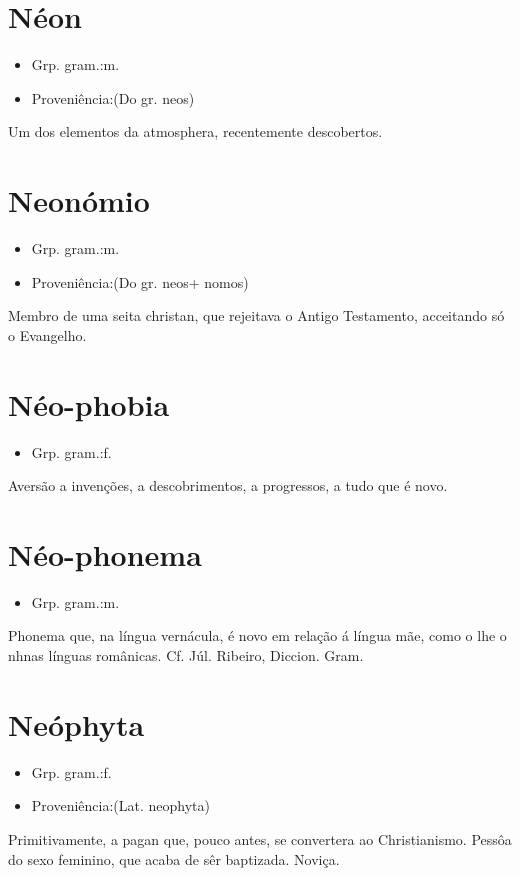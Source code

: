 \section{Néon}
\begin{itemize}
\item {Grp. gram.:m.}
\end{itemize}
\begin{itemize}
\item {Proveniência:(Do gr. \textunderscore neos\textunderscore )}
\end{itemize}
Um dos elementos da atmosphera, recentemente descobertos.
\section{Neonómio}
\begin{itemize}
\item {Grp. gram.:m.}
\end{itemize}
\begin{itemize}
\item {Proveniência:(Do gr. \textunderscore neos\textunderscore  + \textunderscore nomos\textunderscore )}
\end{itemize}
Membro de uma seita christan, que rejeitava o \textunderscore Antigo Testamento\textunderscore , acceitando só o \textunderscore Evangelho\textunderscore .
\section{Néo-phobia}
\begin{itemize}
\item {Grp. gram.:f.}
\end{itemize}
Aversão a invenções, a descobrimentos, a progressos, a tudo que é novo.
\section{Néo-phonema}
\begin{itemize}
\item {Grp. gram.:m.}
\end{itemize}
Phonema que, na língua vernácula, é novo em relação á língua mãe, como o \textunderscore lh\textunderscore  e o \textunderscore nh\textunderscore  nas línguas românicas. Cf. Júl. Ribeiro, \textunderscore Diccion. Gram.\textunderscore 
\section{Neóphyta}
\begin{itemize}
\item {Grp. gram.:f.}
\end{itemize}
\begin{itemize}
\item {Proveniência:(Lat. \textunderscore neophyta\textunderscore )}
\end{itemize}
Primitivamente, a pagan que, pouco antes, se convertera ao Christianismo.
Pessôa do sexo feminino, que acaba de sêr baptizada.
Noviça.
